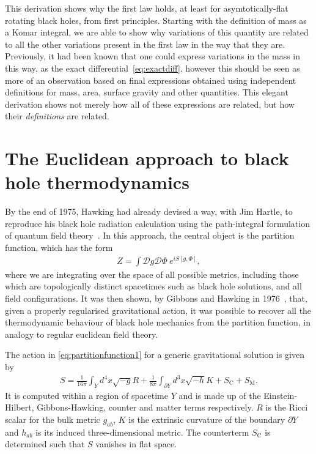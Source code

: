 \documentclass[
twoside,
openright,
frontopenright,
]{dmathesis}
\begin{document}
This derivation shows why the first law holds, at least for asymtotically-flat
rotating black holes, from first principles. Starting with the definition of
mass as a Komar integral, we are able to show why variations of this quantity
are related to all the other variations present in the first law in the way that
they are. Previously, it had been known that one could express variations in the
mass in this way, as the exact differential~\eqref{eq:exactdiff}, however this
should be seen as more of an observation based on final expressions obtained using
independent definitions for mass, area, surface gravity and other
quantities. This elegant derivation shows not merely how all of these
expressions are related, but how their \emph{definitions} are related.

\section{The Euclidean approach to black hole thermodynamics}
\label{sec:euclidean}

By the end of 1975, Hawking had already devised a way, with Jim Hartle, to
reproduce his black hole radiation calculation using the path-integral
formulation of quantum field theory~\cite{Hartle:1976tp}. In this approach, the
central object is the partition function, which has the form
\begin{align}
  \label{eq:partitionfunction1}
  Z = \int \mathcal{D}g \mathcal{D} \Phi~e^{iS[g,\Phi]},
\end{align}
where we are integrating over the space of all possible metrics, including those
which are topologically distinct spacetimes such as black hole solutions, and
all field configurations. It was then shown, by Gibbons and Hawking in
1976~\cite{Gibbons:1976ue}, that, given a properly regularised gravitational
action, it was possible to recover all the thermodynamic behaviour of black hole
mechanics from the partition function, in analogy to regular euclidean field
theory.

The action in \cref{eq:partitionfunction1} for a generic gravitational solution
is given by
\begin{align}
  S = \frac{1}{16\pi}\int_Y d^4x \sqrt{-g} R + \frac{1}{8\pi}\int_{\partial
  Y}d^3x\sqrt{-h}K + S_\mathrm{C} + S_\mathrm{M}.
\end{align}
It is computed within a region of spacetime $Y$ and is made up of the
Einstein-Hilbert, Gibbons-Hawking, counter and matter terms respectively. $R$ is
the Ricci scalar for the bulk metric $g_{ab}$, $K$ is the extrinsic curvature of the
boundary $\partial Y$ and $h_{ab}$ is its induced three-dimensional metric. The
counterterm $S_\mathrm{C}$ is determined such that $S$ vanishes in flat space.
\end{document}
